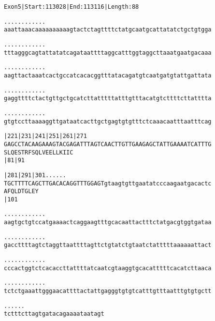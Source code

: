 \documentclass{article}
\begin{document}
\begin{alltt}
Exon 5 | Start: 113028 | End: 113116 | Length: 88

.    .    .    .    .    .    .    .    .    .    .    .    
aaattaaacaaaaaaaaaagtactctagttttctatgcaatgcattatatctgctgtgga

.    .    .    .    .    .    .    .    .    .    .    .    
tttagggcagtattatatcagataattttaggcatttggtaggcttaaatgaatgacaaa

.    .    .    .    .    .    .    .    .    .    .    .    
aagttactaaatcactgccatcacacggtttatacagatgtcaatgatgtattgattata

.    .    .    .    .    .    .    .    .    .    .    .    
gaggttttctactgttgctgcatcttatttttatttgtttacatgtcttttcttatttta

.    .    .    .    .    .    .    .    .    .    .    .    
gtgtccttaaaaggttgataatcacttgctgagtgtgtttctcaaacaatttaatttcag

        |221      |231      |241      |251      |261      |271
GAGCCTACAAGAAAGTACGAGATTTAGTCAACTTGTTGAAGAGCTATTGAAAATCATTTG
 S  L  Q  E  S  T  R  F  S  Q  L  V  E  E  L  L  K  I  I  C 
                            |81                           |91

        |281      |291      |301 .    .    .    .    .    . 
TGCTTTTCAGCTTGACACAGGTTTGGAGTgtaagtgttgaatatcccaagaatgacactc
 A  F  Q  L  D  T  G  L  E  Y                               
                            |101                            

   .    .    .    .    .    .    .    .    .    .    .    . 
aagtgctgtccatgaaaactcaggaagtttgcacaattactttctatgacgtggtgataa

   .    .    .    .    .    .    .    .    .    .    .    . 
gaccttttagtctaggttaattttagttctgtatctgtaatctatttttaaaaaattact

   .    .    .    .    .    .    .    .    .    .    .    . 
cccactggtctcacaccttattttatcaatcgtaaggtgcacatttttcacatcttaaca

   .    .    .    .    .    .    .    .    .    .    .    . 
tctctgaaattgggaacattttactattgagggtgtgtcatttgtttaatttgtgtgctt

   .    .    .    .    .    .
tctttcttagtgatacagaaaataatagt
\end{alltt}
\newpage
\end{document}
